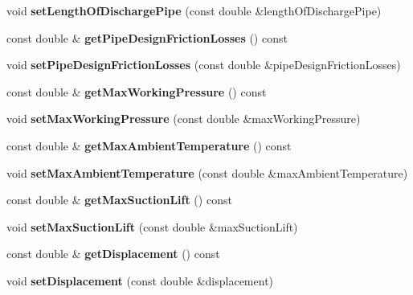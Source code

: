 \begin{DoxyCompactItemize}
void {\bfseries set\+Length\+Of\+Discharge\+Pipe} (const double \&length\+Of\+Discharge\+Pipe)
\item 
\mbox{\label{class_pump_data_a65f201e0a27b1addfcdcc44a3a2b0ce2}} 
const double \& {\bfseries get\+Pipe\+Design\+Friction\+Losses} () const
\item 
\mbox{\label{class_pump_data_afaf58ba66b7714878a0180b332da17b9}} 
void {\bfseries set\+Pipe\+Design\+Friction\+Losses} (const double \&pipe\+Design\+Friction\+Losses)
\item 
\mbox{\label{class_pump_data_a27771201ffe82a9a49b0d9a981674f90}} 
const double \& {\bfseries get\+Max\+Working\+Pressure} () const
\item 
\mbox{\label{class_pump_data_a5d240f222e2d297f17bc10016bfd7654}} 
void {\bfseries set\+Max\+Working\+Pressure} (const double \&max\+Working\+Pressure)
\item 
\mbox{\label{class_pump_data_aa9f7f94583ff187ca3875fb9b7fe776e}} 
const double \& {\bfseries get\+Max\+Ambient\+Temperature} () const
\item 
\mbox{\label{class_pump_data_a077784050e8dc1c4f864d92af665421a}} 
void {\bfseries set\+Max\+Ambient\+Temperature} (const double \&max\+Ambient\+Temperature)
\item 
\mbox{\label{class_pump_data_a12250c120010554b62c5065c044725e4}} 
const double \& {\bfseries get\+Max\+Suction\+Lift} () const
\item 
\mbox{\label{class_pump_data_ab71b920ada4c621985ca52695facbf08}} 
void {\bfseries set\+Max\+Suction\+Lift} (const double \&max\+Suction\+Lift)
\item 
\mbox{\label{class_pump_data_ab13a39172ad7f6faefcbc75020503b61}} 
const double \& {\bfseries get\+Displacement} () const
\item 
\mbox{\label{class_pump_data_a5232994893f1a96ffc5dd9d32aee71cc}} 
void {\bfseries set\+Displacement} (const double \&displacement)
\item 

\end{DoxyCompactItemize}
